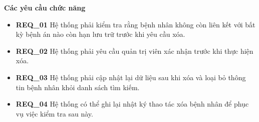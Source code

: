 \noindent \textbf{Các yêu cầu chức năng}

\begin{itemize}

  \item \textbf{REQ\_01} Hệ thống phải kiểm tra rằng bệnh nhân không còn liên kết với bất kỳ bệnh án nào còn hạn lưu trữ trước khi yêu cầu xóa.

  \item \textbf{REQ\_02} Hệ thống phải yêu cầu quản trị viên xác nhận trước khi thực hiện xóa.

  \item \textbf{REQ\_03} Hệ thống phải cập nhật lại dữ liệu sau khi xóa và loại bỏ thông tin bệnh nhân khỏi danh sách tìm kiếm.

  \item \textbf{REQ\_04} Hệ thống có thể ghi lại nhật ký thao tác xóa bệnh nhân để phục vụ việc kiểm tra sau này.

\end{itemize}
